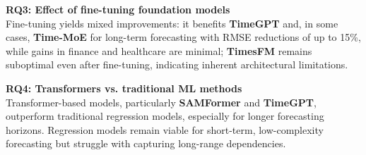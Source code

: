 \vspace{2mm}
\textbf{RQ3: Effect of fine-tuning foundation models} \\[1mm]
\noindent Fine-tuning yields mixed improvements: it benefits \textbf{TimeGPT} and, in some cases, \textbf{Time-MoE} for long-term forecasting with RMSE reductions of up to 15\%, while gains in finance and healthcare are minimal; \textbf{TimesFM} remains suboptimal even after fine-tuning, indicating inherent architectural limitations.

\vspace{2mm}
\textbf{RQ4: Transformers vs. traditional ML methods} \\[1mm]
\noindent Transformer-based models, particularly \textbf{SAMFormer} and \textbf{TimeGPT}, outperform traditional regression models, especially for longer forecasting horizons. Regression models remain viable for short-term, low-complexity forecasting but struggle with capturing long-range dependencies.